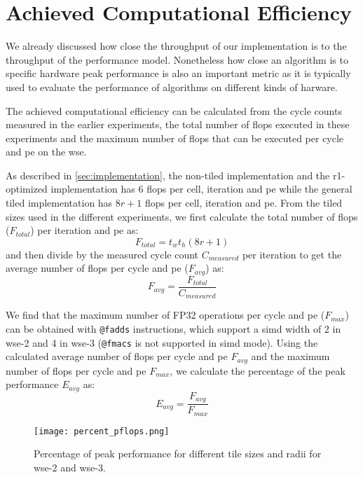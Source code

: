 \section{Achieved Computational Efficiency}
We already discussed how close the throughput of our implementation is to the throughput of the performance model.
Nonetheless how close an algorithm is to specific hardware peak performance is also an important metric as it is typically used to evaluate the performance of algorithms on different kinds of harware.

The achieved computational efficiency can be calculated from the cycle counts measured in the earlier experiments, the total number of \acp{flop} executed in these experiments and the maximum number of \acp{flop} that can be executed per cycle and \ac{pe} on the \ac{wse}.

As described in \autoref{sec:implementation}, the non-tiled implementation and the r1-optimized implementation has \num{6} \acp{flop} per cell, iteration and \ac{pe} while the general tiled implementation has $8r+1$ \acp{flop} per cell, iteration and \ac{pe}. From the tiled sizes used in the different experiments, we first calculate the total number of \acp{flop} ($F_{total}$) per iteration and \ac{pe} as:
\begin{equation}
    F_{total} = t_w t_h (8r+1)
\end{equation}
and then divide by the measured cycle count $C_{measured}$ per iteration to get the average number of \acp{flop} per cycle and \ac{pe} ($F_{avg}$) as:
\begin{equation}
    F_{avg} = \frac{F_{total}}{C_{measured}}
\end{equation}

We find that the maximum number of FP32 operations per cycle and \ac{pe} ($F_{max}$) can be obtained with \texttt{@fadds} instructions, which support a \ac{simd} width of 2 in \ac{wse}-2 and 4 in \ac{wse}-3 (\texttt{@fmacs} is not supported in \ac{simd} mode). Using the calculated average number of \acp{flop} per cycle and \ac{pe} $F_{avg}$ and the maximum number of \acp{flop} per cycle and \ac{pe} $F_{max}$, we calculate the percentage of the peak performance $E_{avg}$ as:
\begin{equation}
    E_{avg} = \frac{F_{avg}}{F_{max}}
\end{equation}

\begin{figure}[h]
    \centering
    \texttt{[image: percent\_pflops.png]}
    \caption{Percentage of peak performance for different tile sizes and radii for \ac{wse}-2 and \ac{wse}-3.}
    \label{fig:percent_pflops}
\end{figure}

